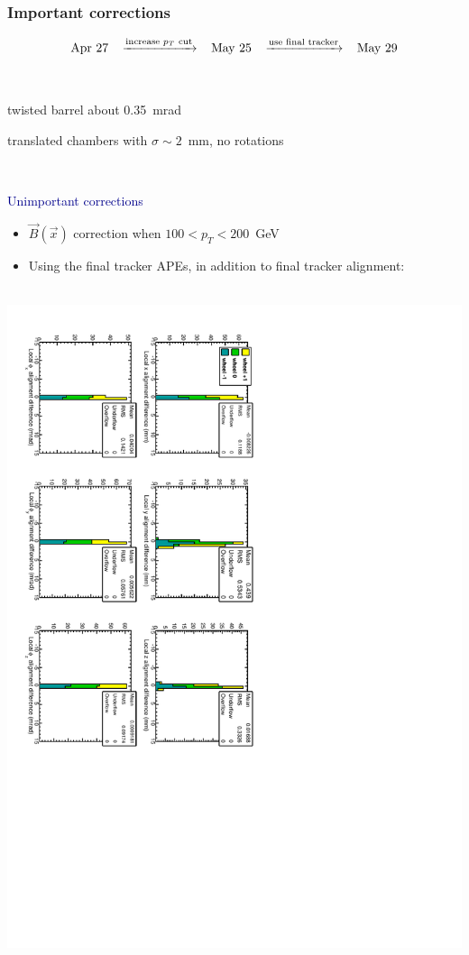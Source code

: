 \documentclass[compress]{beamer}
\begin{document}
\begin{frame}
\frametitle{Important corrections}

\[ \mbox{Apr 27\hspace{0.3 cm}} \xrightarrow{\mbox{\scriptsize increase $p_T$ cut}} \mbox{\hspace{0.3 cm}May 25\hspace{0.3 cm}} \xrightarrow{\mbox{\scriptsize use final tracker}} \mbox{\hspace{0.3 cm}May 29} \]

\mbox{ } \hfill \begin{minipage}{3.8 cm} \scriptsize twisted barrel about 0.35~mrad \end{minipage} \hfill \begin{minipage}{3.5 cm} \scriptsize translated chambers with $\sigma \sim 2$~mm, no rotations \end{minipage} \hfill \mbox{ }

\vspace{0.35 cm}
\hspace{-0.83 cm} \textcolor{darkblue}{\Large Unimportant corrections}

\begin{itemize}
\item $\vec{B}(\vec{x})$ correction when $100 < p_T < 200$~GeV
\item Using the final tracker APEs, in addition to final tracker alignment:
\end{itemize}

\mbox{ } \hfill \includegraphics[height=0.75\linewidth, angle=90]{hip_finaltrackerAPEdiff.pdf} \hfill \mbox{ }
\end{frame}
\end{document}

